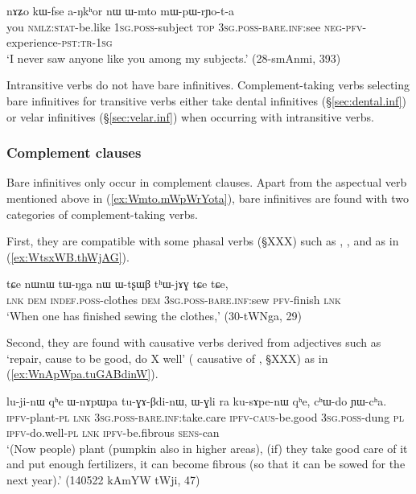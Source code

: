 \begin{exe} 
\ex \label{ex:Wmto.mWpWrYota}
\gll nɤʑo kɯ-fse a-ŋkʰor nɯ ɯ-mto mɯ-pɯ-rɲo-t-a \\
you \textsc{nmlz:stat}-be.like \textsc{1sg.poss}-subject \textsc{top} \textsc{3sg.poss}-\textsc{bare.inf:}see \textsc{neg-pfv}-experience-\textsc{pst:tr-1sg} \\
\glt `I never saw anyone like you among my subjects.' (28-smAnmi,  393)
\end{exe} 

Intransitive verbs do not have bare infinitives. Complement-taking verbs selecting bare infinitives for transitive verbs either take dental  infinitives (§\ref{sec:dental.inf}) or velar infinitives (§\ref{sec:velar.inf}) when occurring with intransitive verbs.

\subsubsection{Complement clauses} \label{sec:bare.inf.complement}
Bare infinitives only occur in complement clauses. Apart from the aspectual verb  mentioned above in (\ref{ex:Wmto.mWpWrYota}), bare infinitives are found with two categories of complement-taking verbs.

First, they are compatible with some phasal verbs (§XXX) such as , ,  and  as in (\ref{ex:WtsxWB.thWjAG}).

\begin{exe} 
\ex \label{ex:WtsxWB.thWjAG}
\gll  tɕe nɯnɯ tɯ-ŋga nɯ ɯ-tʂɯβ tʰɯ-jɤɣ tɕe tɕe, \\
\textsc{lnk} \textsc{dem} \textsc{indef}.\textsc{poss}-clothes \textsc{dem} \textsc{3sg}.\textsc{poss}-\textsc{bare}.\textsc{inf}:sew \textsc{pfv}-finish \textsc{lnk} \\
\glt `When one has finished sewing the clothes,' (30-tWNga, 29)
\end{exe} 

Second, they are found with causative verbs derived from adjectives such as  `repair, cause to be good, do X well' ( causative of , §XXX) as in (\ref{ex:WnApWpa.tuGABdinW}).

\begin{exe} 
\ex \label{ex:WnApWpa.tuGABdinW}
\gll lu-ji-nɯ qʰe ɯ-nɤpɯpa tu-ɣɤ-βdi-nɯ, ɯ-ɣli ra ku-sɤpe-nɯ qʰe, cʰɯ-do ɲɯ-cʰa. \\
\textsc{ipfv}-plant-\textsc{pl} \textsc{lnk} \textsc{3sg}.\textsc{poss}-\textsc{bare}.\textsc{inf}:take.care \textsc{ipfv}-\textsc{caus}-be.good \textsc{3sg}.\textsc{poss}-dung \textsc{pl} \textsc{ipfv}-do.well-\textsc{pl} \textsc{lnk} \textsc{ipfv}-be.fibrous \textsc{sens}-can \\
\glt `(Now people) plant (pumpkin also in higher areas), (if) they take good care of it and put enough fertilizers, it can become fibrous (so that it can be sowed for the next year).' (140522 kAmYW tWji, 47)
\end{exe} 

